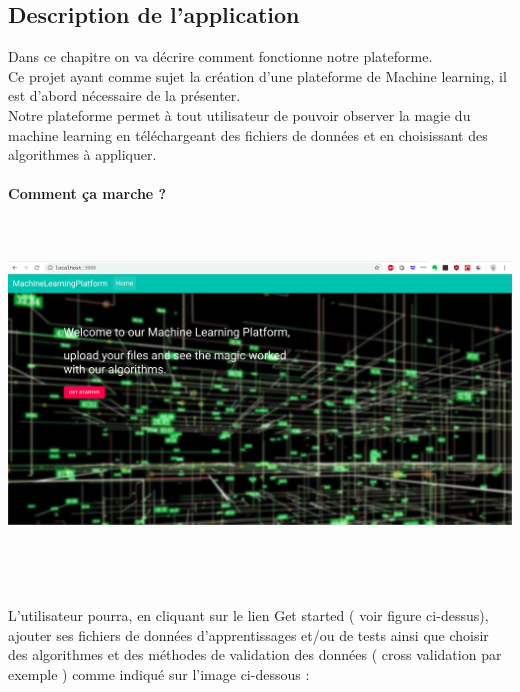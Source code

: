 \documentclass[a4paper,11pt]{article}
\begin{document}
    \subsection{Description de l'application}
Dans ce chapitre on va décrire comment fonctionne notre plateforme.\\
Ce projet ayant comme sujet la création d’une plateforme de Machine learning, il est d’abord nécessaire de la présenter.\\
Notre plateforme permet à tout utilisateur de pouvoir observer la magie du machine learning en téléchargeant des fichiers de données et en choisissant des algorithmes
à appliquer.\\\\
\textbf{Comment ça marche ?}\\
\includegraphics[width=17cm, height=10cm]{homePage.png}\\\\
L’utilisateur pourra, en cliquant sur le lien \og Get started \fg( voir figure ci-dessus), ajouter ses fichiers de données d’apprentissages et/ou de tests ainsi que choisir des algorithmes et des méthodes de validation des données ( cross validation par exemple ) comme indiqué sur l’image ci-dessous :\\\\
\end{document}
